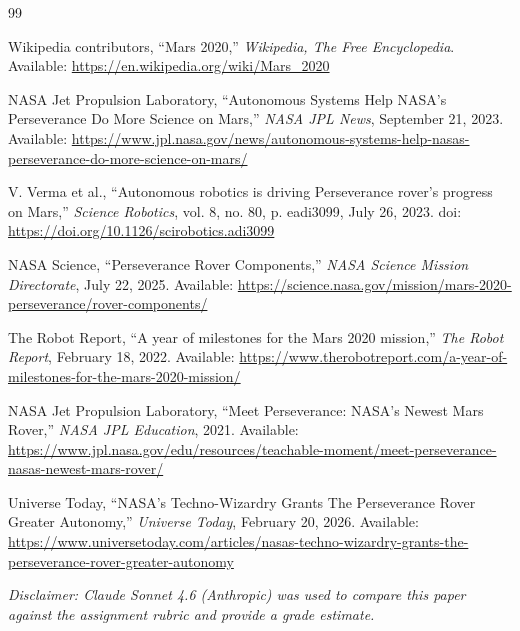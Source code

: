 \documentclass[11pt]{article}
\begin{document}
\begin{thebibliography}{99}

Wikipedia contributors,
``Mars 2020,''
\textit{Wikipedia, The Free Encyclopedia}.
Available: \url{https://en.wikipedia.org/wiki/Mars_2020}

NASA Jet Propulsion Laboratory,
``Autonomous Systems Help NASA's Perseverance Do More Science on Mars,''
\textit{NASA JPL News}, September 21, 2023.
Available: \url{https://www.jpl.nasa.gov/news/autonomous-systems-help-nasas-perseverance-do-more-science-on-mars/}

V. Verma et al.,
``Autonomous robotics is driving Perseverance rover's progress on Mars,''
\textit{Science Robotics}, vol. 8, no. 80, p. eadi3099, July 26, 2023.
doi: \url{https://doi.org/10.1126/scirobotics.adi3099}

NASA Science,
``Perseverance Rover Components,''
\textit{NASA Science Mission Directorate}, July 22, 2025.
Available: \url{https://science.nasa.gov/mission/mars-2020-perseverance/rover-components/}

The Robot Report,
``A year of milestones for the Mars 2020 mission,''
\textit{The Robot Report}, February 18, 2022.
Available: \url{https://www.therobotreport.com/a-year-of-milestones-for-the-mars-2020-mission/}

NASA Jet Propulsion Laboratory,
``Meet Perseverance: NASA's Newest Mars Rover,''
\textit{NASA JPL Education}, 2021.
Available: \url{https://www.jpl.nasa.gov/edu/resources/teachable-moment/meet-perseverance-nasas-newest-mars-rover/}

Universe Today,
``NASA's Techno-Wizardry Grants The Perseverance Rover Greater Autonomy,''
\textit{Universe Today}, February 20, 2026.
Available: \url{https://www.universetoday.com/articles/nasas-techno-wizardry-grants-the-perseverance-rover-greater-autonomy}

\end{thebibliography}

\vspace{1em}
\noindent\textit{\small Disclaimer: Claude Sonnet 4.6 (Anthropic) was used to compare this paper against the assignment rubric and provide a grade estimate.}
\end{document}
